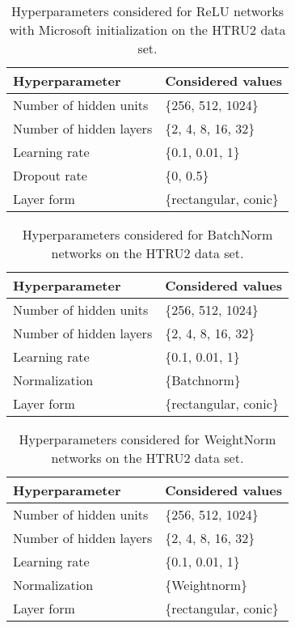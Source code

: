 \documentclass{article}
\begin{document}
\begin{table}[htp]
\begin{center}
\caption[Hyperparameters considered for ReLU networks on the HTRU2 data set.]{Hyperparameters considered for ReLU networks with Microsoft initialization on the HTRU2 data set.}
\begin{tabular}{ll}
\toprule
Hyperparameter  & Considered values \\ 
\midrule
  Number of hidden units & \{256, 512, 1024\} \\
  Number of hidden layers & \{2, 4, 8, 16, 32\} \\
  Learning rate & \{0.1, 0.01, 1\} \\
  Dropout rate & \{0, 0.5\}\\
  Layer form & \{rectangular, conic\} \\
\bottomrule
\end{tabular}
\end{center}
\end{table}



\begin{table}[htp]
\begin{center}
\caption{Hyperparameters considered for BatchNorm networks on the HTRU2 data set.}
\begin{tabular}{ll}
\toprule
Hyperparameter  & Considered values \\ 
\midrule
  Number of hidden units & \{256, 512, 1024\} \\
  Number of hidden layers & \{2, 4, 8, 16, 32\} \\
  Learning rate & \{0.1, 0.01, 1\} \\
  Normalization & \{Batchnorm\} \\
  Layer form & \{rectangular, conic\} \\
\bottomrule
\end{tabular}
\end{center}
\end{table}


\begin{table}[htp]
\begin{center}
\caption{Hyperparameters considered for WeightNorm networks on the HTRU2 data set.}
\begin{tabular}{ll}
\toprule
Hyperparameter  & Considered values \\ 
\midrule
  Number of hidden units & \{256, 512, 1024\} \\
  Number of hidden layers & \{2, 4, 8, 16, 32\} \\
  Learning rate & \{0.1, 0.01, 1\} \\
  Normalization & \{Weightnorm\} \\
  Layer form & \{rectangular, conic\} \\
\bottomrule
\end{tabular}
\end{center}
\end{table}
\end{document}
